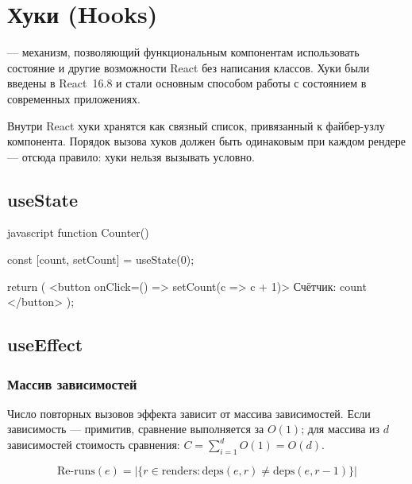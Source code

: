 \section{Хуки (Hooks)}

 — механизм, позволяющий функциональным компонентам
использовать состояние и другие возможности React без написания классов.
Хуки были введены в React~16.8 и стали основным способом работы
с состоянием в современных приложениях.

Внутри React хуки хранятся как связный список, привязанный к
файбер-узлу компонента.  Порядок вызова хуков должен быть одинаковым
при каждом рендере — отсюда правило: хуки нельзя вызывать условно.

\subsection{useState}

\begin{code}{javascript}
function Counter() {
  const [count, setCount] = useState(0);

  return (
    <button onClick={() => setCount(c => c + 1)}>
      Счётчик: {count}
    </button>
  );
}
\end{code}

\subsection{useEffect}

\subsubsection{Массив зависимостей}

Число повторных вызовов эффекта зависит от массива зависимостей.
Если зависимость — примитив, сравнение выполняется за $O(1)$;
для массива из $d$ зависимостей стоимость сравнения:
$C = \sum_{i=1}^{d} O(1) = O(d)$.

\begin{equation}
  \text{Re-runs}(e) = \bigl|\{r \in \text{renders} : \text{deps}(e, r) \neq \text{deps}(e, r-1)\}\bigr|
\end{equation}



